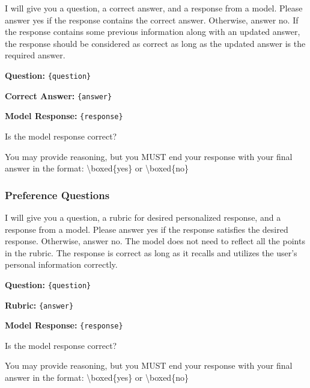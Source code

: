 \begin{tcolorbox}[
    colback=teal!5!white,
    colframe=teal!60!black,
    title=Judge Prompt: Knowledge Update Questions,
    fonttitle=\bfseries,
    coltitle=white,
    colbacktitle=teal!60!black,
    boxrule=1.0pt,
    arc=1.5mm,
    enhanced,
    breakable
]
\small
I will give you a question, a correct answer, and a response from a model. Please answer yes if the response contains the correct answer. Otherwise, answer no. If the response contains some previous information along with an updated answer, the response should be considered as correct as long as the updated answer is the required answer.

\vspace{0.2cm}

\textbf{Question:} \texttt{\{question\}}

\textbf{Correct Answer:} \texttt{\{answer\}}

\textbf{Model Response:} \texttt{\{response\}}

\vspace{0.2cm}

Is the model response correct?

You may provide reasoning, but you MUST end your response with your final answer in the format: \textbackslash boxed\{yes\} or \textbackslash boxed\{no\}
\end{tcolorbox}

\subsubsection{Preference Questions}

\begin{tcolorbox}[
    colback=teal!5!white,
    colframe=teal!60!black,
    title=Judge Prompt: Preference Questions,
    fonttitle=\bfseries,
    coltitle=white,
    colbacktitle=teal!60!black,
    boxrule=1.0pt,
    arc=1.5mm,
    enhanced,
    breakable
]
\small
I will give you a question, a rubric for desired personalized response, and a response from a model. Please answer yes if the response satisfies the desired response. Otherwise, answer no. The model does not need to reflect all the points in the rubric. The response is correct as long as it recalls and utilizes the user's personal information correctly.

\vspace{0.2cm}

\textbf{Question:} \texttt{\{question\}}

\textbf{Rubric:} \texttt{\{answer\}}

\textbf{Model Response:} \texttt{\{response\}}

\vspace{0.2cm}

Is the model response correct?

You may provide reasoning, but you MUST end your response with your final answer in the format: \textbackslash boxed\{yes\} or \textbackslash boxed\{no\}
\end{tcolorbox}

